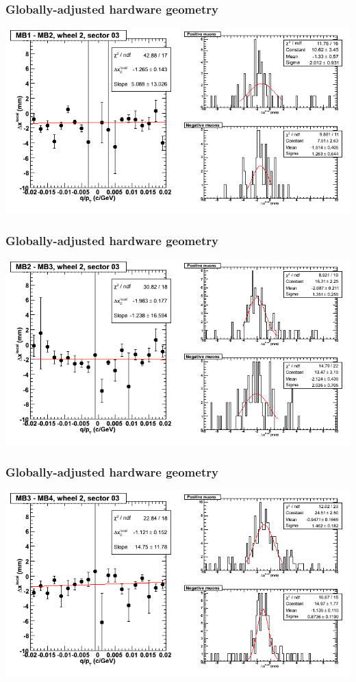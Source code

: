 \documentclass[compress]{beamer}
\begin{document}
\begin{frame}
\frametitle{Globally-adjusted hardware geometry}
\includegraphics[width=\linewidth]{NOV4_segdiffs_HW/dt13_resid_E_03_12.png}
\end{frame}

\begin{frame}
\frametitle{Globally-adjusted hardware geometry}
\includegraphics[width=\linewidth]{NOV4_segdiffs_HW/dt13_resid_E_03_23.png}
\end{frame}

\begin{frame}
\frametitle{Globally-adjusted hardware geometry}
\includegraphics[width=\linewidth]{NOV4_segdiffs_HW/dt13_resid_E_03_34.png}
\end{frame}
\end{document}
